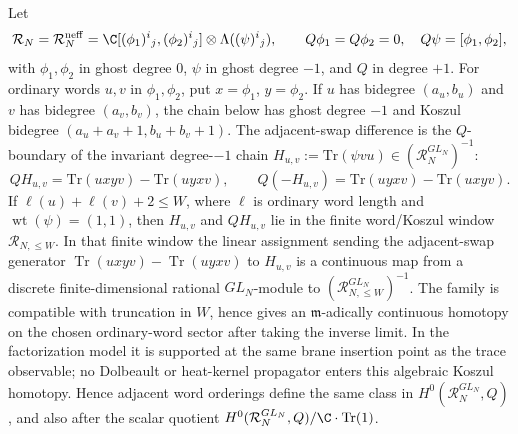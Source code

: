 \documentclass[11pt]{memoir}
\begin{document}
\begin{lem}\label{lem:koszul-adjacent-transpositions}
  Let
  \[
    \mathcal R_N=\mathcal R_N^{\mathrm{neff}}=
    \C[(\phi_1)^i{}_j,(\phi_2)^i{}_j]\otimes
    \Lambda((\psi)^i{}_j),
    \qquad
    Q\phi_1=Q\phi_2=0,\quad Q\psi=[\phi_1,\phi_2],
  \]
  with \(\phi_1,\phi_2\) in ghost degree \(0\), \(\psi\) in ghost degree
  \(-1\), and \(Q\) in degree \(+1\).  For ordinary words \(u,v\) in
  \(\phi_1,\phi_2\), put \(x=\phi_1\), \(y=\phi_2\).  If \(u\) has
  bidegree \((a_u,b_u)\) and \(v\) has bidegree \((a_v,b_v)\), the
  chain below has ghost degree \(-1\) and Koszul bidegree
  \((a_u+a_v+1,b_u+b_v+1)\).  The adjacent-swap difference is the
  \(Q\)-boundary of the invariant degree-\(-1\) chain
  \(H_{u,v}:=\mathrm{Tr}(\psi vu)\in(\mathcal R_N^{GL_N})^{-1}\):
  \begin{equation}\label{eq:koszul-adjacent-transposition-homotopy}
    QH_{u,v}
      =
    \mathrm{Tr}(uxyv)-\mathrm{Tr}(uyxv),
    \qquad
    Q(-H_{u,v})
      =
    \mathrm{Tr}(uyxv)-\mathrm{Tr}(uxyv).
  \end{equation}
  If \(\ell(u)+\ell(v)+2\le W\), where \(\ell\) is ordinary word
  length and \(\operatorname{wt}(\psi)=(1,1)\), then
  \(H_{u,v}\) and \(QH_{u,v}\) lie in the finite word/Koszul window
  \(\mathcal R_{N,\le W}\).  In that finite window the linear assignment
  sending the adjacent-swap generator
  \(\operatorname{Tr}(uxyv)-\operatorname{Tr}(uyxv)\) to \(H_{u,v}\) is
  a continuous map from a discrete finite-dimensional rational
  \(GL_N\)-module to \((\mathcal R_{N,\le W}^{GL_N})^{-1}\).  The family
  is compatible with truncation in \(W\), hence gives an
  \(\mathfrak m\)-adically continuous homotopy on the chosen
  ordinary-word sector after taking the inverse limit.  In the
  factorization model it is supported at the same brane insertion point
  as the trace observable; no Dolbeault or heat-kernel propagator enters
  this algebraic Koszul homotopy.
  Hence adjacent word orderings define the same class in
  \(H^0(\mathcal R_N^{GL_N},Q)\), and also after the scalar quotient
  \(H^0(\mathcal R_N^{GL_N},Q)/\C\cdot\mathrm{Tr}(1)\).
\end{lem}
\end{document}
